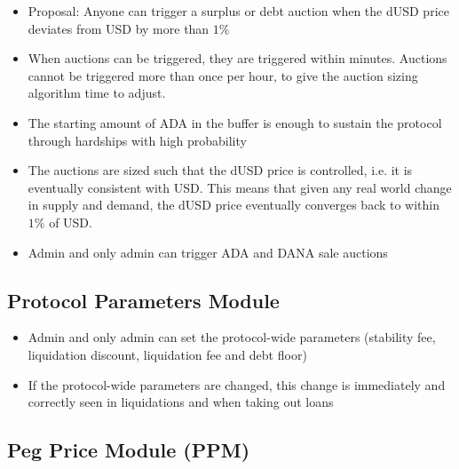\documentclass{article} %
\begin{document}
\begin{itemize}
  \item Proposal: Anyone can trigger a surplus or debt auction when the dUSD
    price deviates from USD by more than $1\%$
  \item When auctions can be triggered, they are triggered within minutes.
    Auctions cannot be triggered more than once per hour, to give the auction
    sizing algorithm time to adjust.
  \item The starting amount of ADA in the buffer is enough to sustain the
    protocol through hardships with high probability
  \item The auctions are sized such that the dUSD price is controlled, i.e. it
    is eventually consistent with USD.
    This means that given any real world change in supply and demand, the dUSD
    price eventually converges back to within $1\%$ of USD.
  \item Admin and only admin can trigger ADA and DANA sale auctions
\end{itemize}

\subsection{Protocol Parameters Module}
\begin{itemize}
  \item Admin and only admin can set the protocol-wide parameters (stability
    fee, liquidation discount, liquidation fee and debt
    floor)
  \item If the protocol-wide parameters are changed, this change is immediately
    and correctly seen in liquidations and when taking out loans
\end{itemize}  

\subsection{Peg Price Module (PPM)}
\end{document}
